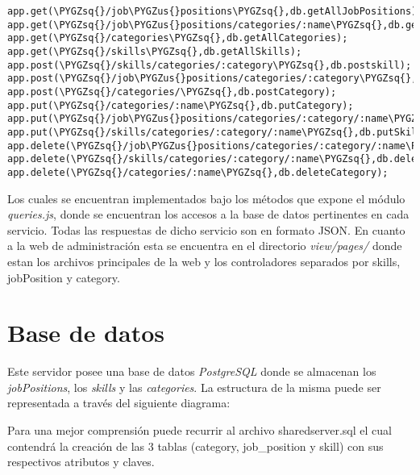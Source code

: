 \documentclass[a4paper,10pt,spanish]{sphinxmanual}
\def\PYGZus{\char`\_}
\def\PYGZsq{\char`\'}
\renewcommand\PYGZsq{\textquotesingle}
\begin{document}
\begin{Verbatim}[commandchars=\\\{\}]
app.get(\PYGZsq{}/job\PYGZus{}positions\PYGZsq{},db.getAllJobPositions);
app.get(\PYGZsq{}/job\PYGZus{}positions/categories/:name\PYGZsq{},db.getAllJobPositionsByCategory);
app.get(\PYGZsq{}/categories\PYGZsq{},db.getAllCategories);
app.get(\PYGZsq{}/skills\PYGZsq{},db.getAllSkills);
app.post(\PYGZsq{}/skills/categories/:category\PYGZsq{},db.postskill);
app.post(\PYGZsq{}/job\PYGZus{}positions/categories/:category\PYGZsq{},db.postJobPosition);
app.post(\PYGZsq{}/categories/\PYGZsq{},db.postCategory);
app.put(\PYGZsq{}/categories/:name\PYGZsq{},db.putCategory);
app.put(\PYGZsq{}/job\PYGZus{}positions/categories/:category/:name\PYGZsq{},db.putJobPosition);
app.put(\PYGZsq{}/skills/categories/:category/:name\PYGZsq{},db.putSkill);
app.delete(\PYGZsq{}/job\PYGZus{}positions/categories/:category/:name\PYGZsq{},db.deleteJobPosition);
app.delete(\PYGZsq{}/skills/categories/:category/:name\PYGZsq{},db.deleteSkill);
app.delete(\PYGZsq{}/categories/:name\PYGZsq{},db.deleteCategory);
\end{Verbatim}

Los cuales se encuentran implementados bajo los métodos que expone el módulo \emph{queries.js}, donde se encuentran los accesos a la base de datos pertinentes en cada servicio. Todas las respuestas de dicho servicio son en formato JSON.
En cuanto a la web de administración esta se encuentra en el directorio \emph{view/pages/} donde estan los archivos principales de la web y los controladores separados por skills, jobPosition y category.


\section{Base de datos}
\label{sharedServer:base-de-datos}
Este servidor posee una base de datos \emph{PostgreSQL} donde se almacenan los \emph{jobPositions}, los \emph{skills} y las \emph{categories}. La estructura de la misma puede ser representada a través del siguiente diagrama:

\noindent{}

Para una mejor comprensión puede recurrir al archivo sharedserver.sql el cual contendrá la creación de las 3 tablas (category, job\_position y skill) con sus respectivos atributos y claves.
\end{document}
